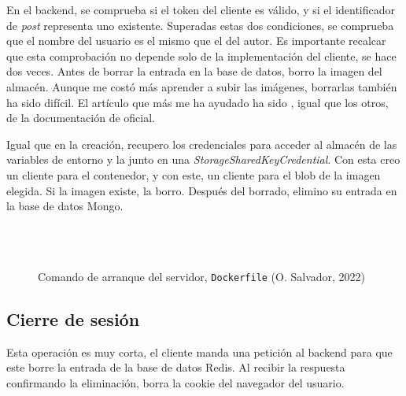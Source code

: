 \documentclass[11pt]{article}
\begin{document}
\begin{flushleft}
	En el backend, se comprueba si el token del cliente es válido, y si el identificador de \textit{post} representa uno existente. Superadas estas dos condiciones, se comprueba que el nombre del usuario es el mismo que el del autor. Es importante recalcar que esta comprobación no depende solo de la implementación del cliente, se hace dos veces. Antes de borrar la entrada en la base de datos, borro la imagen del almacén. Aunque me costó más aprender a subir las imágenes, borrarlas también ha sido difícil. El artículo que más me ha ayudado ha sido \cite{ms_rm_blob}, igual que los otros, de la documentación de oficial.
	\linebreak
	
	Igual que en la creación, recupero los credenciales para acceder al almacén de las variables de entorno y la junto en una \textit{StorageSharedKeyCredential}. Con esta creo un cliente para el contenedor, y con este, un cliente para el blob de la imagen elegida. Si la imagen existe, la borro. Después del borrado, elimino su entrada en la base de datos Mongo.
	\linebreak
	
	\begin{figure}[htb]
        \centering
        \begin{subfigure}{0.9\textwidth}
        \inputminted[fontsize=\scriptsize, firstline=104, lastline=104, linenos, frame=single, breaklines]{javascript}{../../backend/src/resolvers/mutation.js}
        \vspace{-.6cm}
        \inputminted[fontsize=\scriptsize, firstline=107, lastline=110, linenos, frame=single, breaklines]{javascript}{../../backend/src/resolvers/mutation.js}
        \vspace{-.6cm}
        \inputminted[fontsize=\scriptsize, firstline=118, lastline=118, linenos, frame=single, breaklines]{javascript}{../../backend/src/resolvers/mutation.js}
        \vspace{-.6cm}
        \inputminted[fontsize=\scriptsize, firstline=126, lastline=126, linenos, frame=single, breaklines]{javascript}{../../backend/src/resolvers/mutation.js}
        \end{subfigure}
        \caption{Comando de arranque del servidor, \texttt{Dockerfile} (O. Salvador, 2022)}
    \end{figure}

	\bigskip
	\bigskip
	
	\subsection{Cierre de sesión}
	Esta operación es muy corta, el cliente manda una petición al backend para que este borre la entrada de la base de datos Redis. Al recibir la respuesta confirmando la eliminación, borra la cookie del navegador del usuario.
	\linebreak














\end{flushleft}
\end{document}
